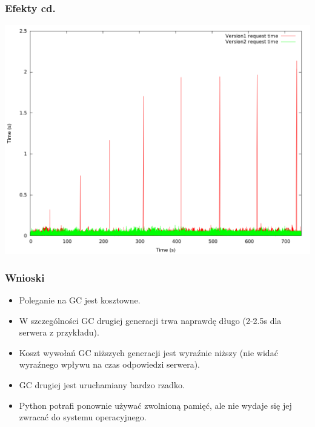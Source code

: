 \documentclass{beamer}
\begin{document}
    \begin{frame}
        \frametitle{Efekty cd.}
        \includegraphics[height=0.8\textheight]{request_time.png}
    \end{frame}

    \begin{frame}
        \frametitle{Wnioski}
        \begin{itemize}
            \item Poleganie na GC jest kosztowne.
            \item W szczególności GC drugiej generacji trwa naprawdę długo (2-2.5s dla serwera z przykładu).
            \item Koszt wywołań GC niższych generacji jest wyraźnie niższy (nie widać wyraźnego wpływu na czas odpowiedzi serwera).
            \item GC drugiej jest uruchamiany bardzo rzadko.
            \item Python potrafi ponownie używać zwolnioną pamięć, ale nie wydaje się jej zwracać do systemu operacyjnego.
        \end{itemize}
    \end{frame}
\end{document}

